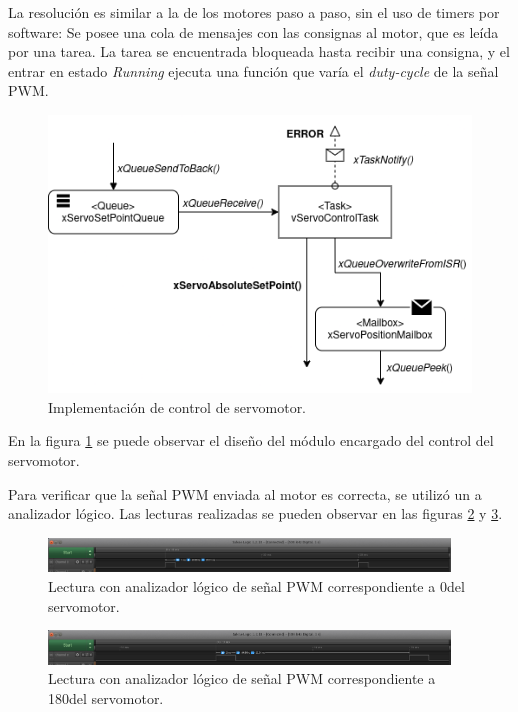 \documentclass{IEEEtran}
\begin{document}
La resolución es similar a la de los motores paso a paso, sin el uso de timers por software: Se posee una cola de mensajes con las consignas al motor, que es leída por una tarea. La tarea se encuentrada bloqueada hasta recibir una consigna, y el entrar en estado \textit{Running} ejecuta una función que varía el \textit{duty-cycle} de la señal PWM.

\begin{figure}[ht]
    \centering
    \includegraphics[scale=0.5]{../diagrama_servo.png}
    \caption{Implementación de control de servomotor.}
    \label{fig:diagrama-servo}
\end{figure}

En la figura \ref{fig:diagrama-servo} se puede observar el diseño del módulo encargado del control del servomotor.

Para verificar que la señal PWM enviada al motor es correcta, se utilizó un a analizador lógico. Las lecturas realizadas se pueden observar en las figuras \ref{fig:sct-pwm-min} y \ref{fig:sct-pwm-max}.

\begin{figure}[ht]
    \centering
    \includegraphics[width=0.95\textwidth]{../sct_pwm_min.png}
    \caption{Lectura con analizador lógico de señal PWM correspondiente a 0\degree del servomotor.}
    \label{fig:sct-pwm-min}
\end{figure}

\begin{figure}[ht]
    \centering
    \includegraphics[width=0.95\textwidth]{../sct_pwm_max.png}
    \caption{Lectura con analizador lógico de señal PWM correspondiente a 180\degree del servomotor.}
    \label{fig:sct-pwm-max}
\end{figure}
\end{document}
